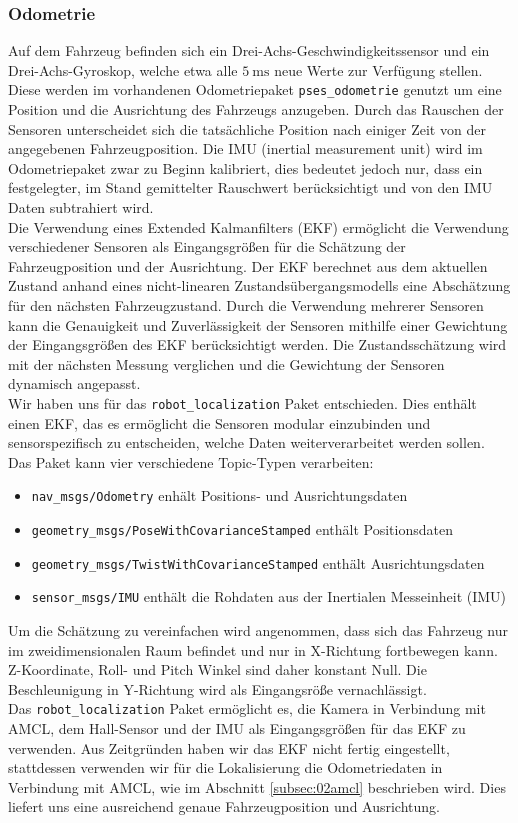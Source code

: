 \subsubsection{Odometrie}
\label{subsec:02odom}
Auf dem Fahrzeug befinden sich ein Drei-Achs-Geschwindigkeitssensor und ein Drei-Achs-Gyroskop, welche etwa alle $\SI{5}{\milli\second}$ neue Werte zur Verf\"ugung stellen. Diese werden im vorhandenen Odometriepaket \texttt{pses\_odometrie} genutzt um eine Position und die Ausrichtung des Fahrzeugs anzugeben. Durch das Rauschen der Sensoren unterscheidet sich die tats\"achliche Position  nach einiger Zeit von der angegebenen Fahrzeugposition. Die IMU (inertial measurement unit) wird im Odometriepaket zwar zu Beginn kalibriert, dies bedeutet jedoch nur, dass ein festgelegter, im Stand gemittelter Rauschwert ber\"ucksichtigt und von den IMU Daten subtrahiert wird.\\
Die Verwendung eines Extended Kalmanfilters (EKF) erm\"oglicht die Verwendung verschiedener Sensoren als Eingangsgr\"o{\ss}en f\"ur die Sch\"atzung der Fahrzeugposition und der Ausrichtung. Der EKF berechnet aus dem aktuellen Zustand anhand eines nicht-linearen Zustands\"ubergangsmodells eine Absch\"atzung f\"ur den n\"achsten Fahrzeugzustand. Durch die Verwendung mehrerer Sensoren kann die Genauigkeit und Zuverl\"assigkeit der Sensoren mithilfe einer Gewichtung der Eingangsgr\"o{\ss}en des EKF ber\"ucksichtigt werden.  Die Zustandssch\"atzung wird mit der n\"achsten Messung verglichen und die Gewichtung der Sensoren dynamisch angepasst.\\
Wir haben uns f\"ur das \texttt{robot\_localization} Paket entschieden. Dies enth\"alt einen EKF, das es erm\"oglicht die Sensoren modular einzubinden und sensorspezifisch zu entscheiden, welche Daten weiterverarbeitet werden sollen.
Das Paket kann vier verschiedene Topic-Typen verarbeiten:
\begin{itemize}
	\item \texttt{nav\_msgs/Odometry} enh\"alt Positions- und Ausrichtungsdaten
	\item \texttt{geometry\_msgs/PoseWithCovarianceStamped} enth\"alt Positionsdaten
	\item \texttt{geometry\_msgs/TwistWithCovarianceStamped} enth\"alt Ausrichtungsdaten
	\item \texttt{sensor\_msgs/IMU} enth\"alt die Rohdaten aus der Inertialen Messeinheit (IMU)
\end{itemize}
Um die Sch\"atzung zu vereinfachen wird angenommen, dass sich das Fahrzeug nur im zweidimensionalen Raum befindet und nur in X-Richtung fortbewegen kann. Z-Koordinate, Roll- und Pitch Winkel sind daher konstant Null. Die Beschleunigung in Y-Richtung wird als Eingangsr\"o{\ss}e vernachl\"assigt. \\
Das \texttt{robot\_localization} Paket erm\"oglicht es, die Kamera in Verbindung mit  AMCL, dem Hall-Sensor und der IMU als Eingangsgr\"o{\ss}en f\"ur das EKF zu verwenden. Aus Zeitgr\"unden haben wir das EKF nicht fertig eingestellt, stattdessen verwenden wir f\"ur die Lokalisierung die Odometriedaten in Verbindung mit AMCL, wie im Abschnitt \ref{subsec:02amcl} beschrieben wird. Dies liefert uns eine ausreichend genaue Fahrzeugposition und Ausrichtung.

